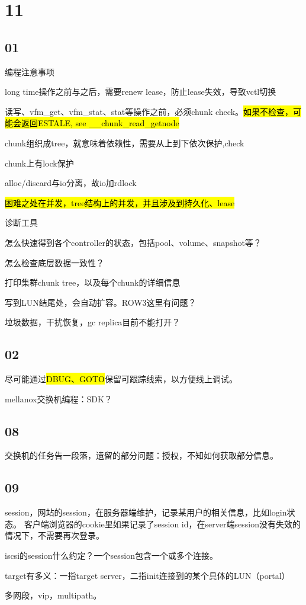 \section{11}

\subsection{01}

编程注意事项
\begin{enumbox}
\item long time操作之前与之后，需要renew lease，防止lease失效，导致vctl切换
\item 读写、vfm\_get、vfm\_stat、stat等操作之前，必须chunk check。\hl{如果不检查，可能会返回ESTALE, see \_\_chunk\_read\_getnode}
\item chunk组织成tree，就意味着依赖性，需要从上到下依次保护,check
\item chunk上有lock保护
\item alloc/discard与io分离，故io加rdlock
\item \hl{困难之处在并发，tree结构上的并发，并且涉及到持久化、lease}
\end{enumbox}

诊断工具
\begin{enumbox}
\item 怎么快速得到各个controller的状态，包括pool、volume、snapshot等？
\item 怎么检查底层数据一致性？
\item 打印集群chunk tree，以及每个chunk的详细信息
\end{enumbox}

写到LUN结尾处，会自动扩容。ROW3这里有问题？

垃圾数据，干扰恢复，gc replica目前不能打开？

\subsection{02}

尽可能通过\hl{DBUG、GOTO}保留可跟踪线索，以方便线上调试。

mellanox交换机编程：SDK？

\subsection{08}

交换机的任务告一段落，遗留的部分问题：授权，不知如何获取部分信息。

\subsection{09}

session，网站的session，在服务器端维护，记录某用户的相关信息，比如login状态。
客户端浏览器的cookie里如果记录了session id，在server端session没有失效的情况下，不需要再次登录。

iscsi的session什么约定？一个session包含一个或多个连接。

target有多义：一指target server，二指init连接到的某个具体的LUN（portal）

多网段，vip，multipath。
